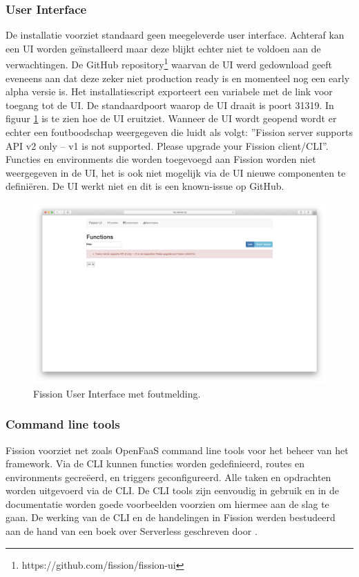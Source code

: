 \subsubsection{User Interface}
De installatie voorziet standaard geen meegeleverde user interface. Achteraf kan een UI worden geïnstalleerd maar deze blijkt echter niet te voldoen aan de verwachtingen. De GitHub repository\footnote{https://github.com/fission/fission-ui} waarvan de UI werd gedownload geeft eveneens aan dat deze zeker niet production ready is en momenteel nog een early alpha versie is. Het installatiescript exporteert een variabele met de link voor toegang tot de UI. De standaardpoort waarop de UI draait is poort 31319. In figuur \ref{fig:fission-ui} is te zien hoe de UI eruitziet. Wanneer de UI wordt geopend wordt er echter een foutboodschap weergegeven die luidt als volgt: ''Fission server supports API v2 only -- v1 is not supported. Please upgrade your Fission client/CLI''. Functies en environments die worden toegevoegd aan Fission worden niet weergegeven in de UI, het is ook niet mogelijk via de UI nieuwe componenten te definiëren. De UI werkt niet en dit is een known-issue op GitHub.
\begin{figure}
    \includegraphics[width=1\textwidth]{img/fission-ui.png}
    \caption{Fission User Interface met foutmelding.}
    \label{fig:fission-ui}  
\end{figure}

\subsubsection{Command line tools}
Fission voorziet net zoals OpenFaaS command line tools voor het beheer van het framework. Via de CLI kunnen functies worden gedefinieerd, routes en environments gecreëerd, en triggers geconfigureerd. Alle taken en opdrachten worden uitgevoerd via de CLI. De CLI tools zijn eenvoudig in gebruik en in de documentatie worden goede voorbeelden voorzien om hiermee aan de slag te gaan. De werking van de CLI en de handelingen in Fission werden bestudeerd aan de hand van een boek over Serverless geschreven door \textcite{McKendrick2018}.

